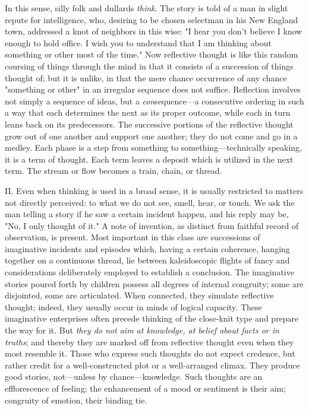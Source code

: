 \documentclass[showtrims,ustradepaper]{memoir}
\begin{document}

In this sense, silly folk and dullards \emph{think}. The story is told
of a man in slight repute for intelligence, who, desiring to be chosen
selectman in his New England town, addressed a knot of neighbors in this
wise: "I hear you don't believe I know enough to hold office. I wish you
to understand that I am thinking about something or other most of the
time." Now reflective thought is like this random coursing of things
through the mind in that it consists of a succession of things thought
of; but it is unlike, in that the mere chance occurrence of any chance
"something or other" in an irregular sequence does not suffice.
Reflection involves not simply a sequence of ideas, but a
\emph{con}sequence---a consecutive ordering in such a way
that
each determines the next as its proper outcome, while each in turn leans
back on its predecessors. The successive portions of the reflective
thought grow out of one another and support one another; they do not
come and go in a medley. Each phase is a step from something to
something---technically speaking, it is a term of thought. Each term
leaves a deposit which is utilized in the next term. The stream or flow
becomes a train, chain, or thread.


II. Even when thinking is used in a broad sense, it is usually
restricted to matters not directly perceived: to what we do not see,
smell, hear, or touch. We ask the man telling a story if he saw a
certain incident happen, and his reply may be, "No, I only thought of
it." A note of invention, as distinct from faithful record of
observation, is present. Most important in this class are successions of
imaginative incidents and episodes which, having a certain coherence,
hanging together on a continuous thread, lie between kaleidoscopic
flights of fancy and considerations deliberately employed to establish a
conclusion. The imaginative stories poured forth by children possess all
degrees of internal congruity; some are disjointed, some are
articulated. When connected, they simulate reflective thought; indeed,
they usually occur in minds of logical capacity. These imaginative
enterprises often precede thinking of the close-knit type and prepare
the way for it. 
But \emph{they do not aim at knowledge, at belief about
facts or in truths}; and thereby they are marked off from reflective
thought even when they most resemble it. Those who express such thoughts
do not expect credence, but rather credit for a well-constructed plot or
a well-arranged climax. They produce good stories, not---unless by
chance---knowledge.
Such thoughts are an efflorescence of feeling; the enhancement of a mood
or sentiment is their aim; congruity of emotion, their binding tie.
\end{document}
